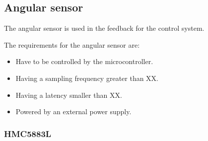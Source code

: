 
\subsection{Angular sensor}
The angular sensor is used in the feedback for the control system.

The requirements for the angular sensor are:
\begin{itemize}
\item Have to be controlled by the microcontroller.
\item Having a sampling frequency greater than XX. 
\item Having a latency smaller than XX. 
\item Powered by an external power supply.
\end{itemize}

\subsubsection{HMC5883L}


%
%
%
%
%
%
%



